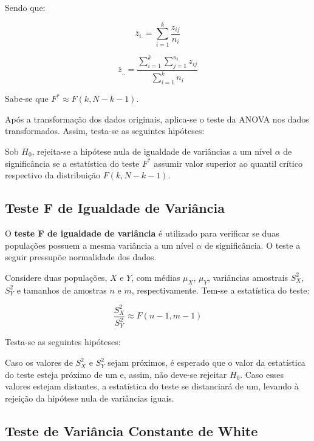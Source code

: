 \documentclass[
]{estat/estat}
\begin{document}
Sendo que:

\[ \bar{z}_{i.} = \sum_{i=1}^{k}\frac{z_{ij}}{n_{i}} \]

\[ \bar{z}_{..} = \frac{\displaystyle \sum_{i=1}^{k}\displaystyle\sum_{j=1}^{n_i}z_{ij}}{\displaystyle\sum_{i=1}^{k}n_i} \]

Sabe-se que \(F^* \approx F(k,N-k-1)\).

Após a transformação dos dados originais, aplica-se o teste da ANOVA nos
dados transformados. Assim, testa-se as seguintes hipóteses:


Sob \(H_0\), rejeita-se a hipótese nula de igualdade de variâncias a um
nível \(\alpha\) de significância se a estatística do teste \(F^*\)
assumir valor superior ao quantil crítico respectivo da distribuição
\(F(k,N-k-1)\).

\subsection{Teste F de Igualdade de
Variância}\label{teste-f-de-igualdade-de-variuxe2ncia}

O \textbf{teste F de igualdade de variância} é utilizado para verificar
se duas populações possuem a mesma variância a um nível \(\alpha\) de
significância. O teste a seguir pressupõe normalidade dos dados.

Considere duas populações, \(X\) e \(Y\), com médias \(\mu_X\),
\(\mu_Y\), variâncias amostrais \(S^2_X\), \(S^2_Y\) e tamanhos de
amostras \(n\) e \(m\), respectivamente. Tem-se a estatística do teste:

\[ \frac{S^2_X}{S^2_Y} \approx F(n - 1, m - 1) \]

Testa-se as seguintes hipóteses:


Caso os valores de \(S^2_X\) e \(S^2_Y\) sejam próximos, é esperado que
o valor da estatística do teste esteja próximo de um e, assim, não
deve-se rejeitar \(H_0\). Caso esses valores estejam distantes, a
estatística do teste se distanciará de um, levando à rejeição da
hipótese nula de variâncias iguais.

\subsection{Teste de Variância Constante de
White}\label{teste-de-variuxe2ncia-constante-de-white}
\end{document}
